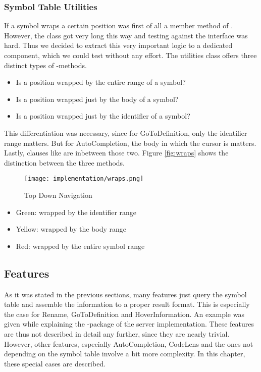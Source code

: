\subsubsection{Symbol Table Utilities}
If a symbol wraps a certain position was first of all a member method of .
However, the class  got very long this way and testing against the interface was hard.
Thus we decided to extract this very important logic to a dedicated component, which we could test without any effort.
The utilities class offers three distinct types of -methods.
\begin{itemize}
    \item Is a position wrapped by the entire range of a symbol?
    \item Is a position wrapped just by the body of a symbol?
    \item Is a position wrapped just by the identifier of a symbol?
\end{itemize}
This differentiation was necessary, since for GoToDefinition, only the identifier range matters.
But for AutoCompletion, the body in which the cursor is matters.
Lastly, clauses like  are inbetween those two.
Figure \ref{fig:wraps} shows the distinction between the three methods.

\begin{figure}[H]
    \centering
    \texttt{[image: implementation/wraps.png]}
    \caption{Top Down Navigation}
    \label{fig:findDecl}
\end{figure}

\begin{itemize}
    \item Green: wrapped by the identifier range
    \item Yellow: wrapped by the body range
    \item Red: wrapped by the entire symbol range
\end{itemize}




\subsection{Features}
\label{section:imp:features}
As it was stated in the previous sections, many features just query the symbol table and assemble the information to a proper result format.
This is especially the case for Rename, GoToDefinition and HoverInformation.
An example was given while explaining the -package of the server implementation.
These features are thus not described in detail any further, since they are nearly trivial.
However, other features, especially AutoCompletion, CodeLens and the ones not depending on the symbol table involve a bit more complexity.
In this chapter, these special cases are described.

